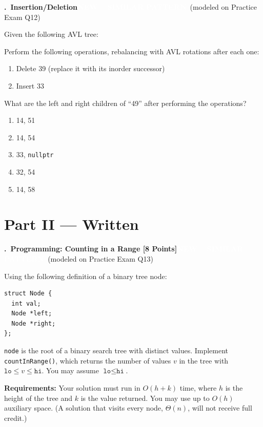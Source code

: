 \documentclass[11pt]{article}
\newcounter{qnum}
\newcommand{\tagnew}[1]{\colorbox{newc}{\textcolor{white}{\footnotesize\textbf{NEW -- SIMILAR PATTERN}}}\ {\footnotesize\textcolor{newc}{(modeled on #1)}}}
\newcommand{\question}[2]{\par\needspace{8\baselineskip}\medskip\stepcounter{qnum}%
  \noindent\textbf{\theqnum.\ #1}\hfill #2\par\nobreak\smallskip}
\newenvironment{choices}{\begin{enumerate}[label=\textbf{\Alph*)}, nosep, leftmargin=2.5em]}{\end{enumerate}}
\begin{document}
\question{Insertion/Deletion}{\tagnew{Practice Exam Q12}}
Given the following AVL tree:
\begin{center}
\end{center}
Perform the following operations, rebalancing with AVL rotations after each one:
\begin{enumerate}[nosep]
  \item Delete 39 (replace it with its inorder successor)
  \item Insert 33
\end{enumerate}
What are the left and right children of ``49'' after performing the operations?
\begin{choices}
  \item 14, 51
  \item 14, 54
  \item 33, \texttt{nullptr}
  \item 32, 54
  \item 14, 58
\end{choices}

\newpage
\section*{Part II --- Written}

\question{Programming: Counting in a Range [8 Points]}{\tagnew{Practice Exam Q13}}
Using the following definition of a binary tree node:
\begin{lstlisting}
struct Node {
  int val;
  Node *left;
  Node *right;
};
\end{lstlisting}
\texttt{node} is the root of a binary search tree with distinct values. Implement \texttt{countInRange()}, which returns
the number of values $v$ in the tree with $\texttt{lo} \le v \le \texttt{hi}$. You may assume $\texttt{lo} \le \texttt{hi}$.

\smallskip\noindent\textbf{Requirements:} Your solution must run in $O(h + k)$ time, where $h$ is the height of the tree
and $k$ is the value returned. You may use up to $O(h)$ auxiliary space. (A solution that visits every node,
$\Theta(n)$, will not receive full credit.)
\end{document}
